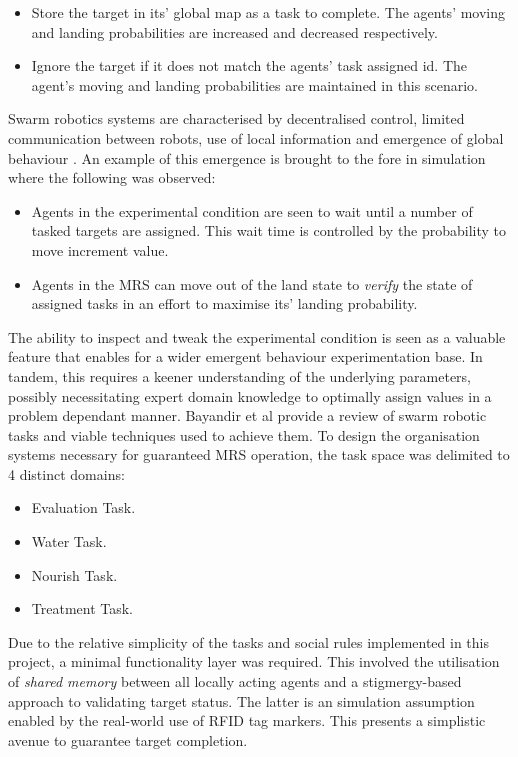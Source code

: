 \documentclass{report}
\begin{document}
\begin{itemize}
	\item Store the target in its' global map as a task to complete. The agents' moving and landing probabilities are increased and decreased respectively.
	\item Ignore the target if it does not match the agents' task assigned id. The agent's moving and landing probabilities are maintained in this scenario.
\end{itemize}

Swarm robotics systems are characterised by decentralised control, limited communication between robots, use of local information and emergence of global behaviour \cite{Dorigo2013}. An example of this emergence is brought to the fore in simulation where the following was observed:
\begin{itemize}
	\item Agents in the experimental condition are seen to wait until a number of tasked targets are assigned. This wait time is controlled by the probability to move increment value.
	\item Agents in the MRS can move out of the land state to \textit{verify} the state of assigned tasks in an effort to maximise its' landing probability.
\end{itemize}

The ability to inspect and tweak the experimental condition is seen as a valuable feature that enables for a wider emergent behaviour experimentation base. In tandem, this requires a keener understanding of the underlying parameters, possibly necessitating expert domain knowledge to optimally assign values in a problem dependant manner. Bayandir et al \cite{Bayindir2016} provide a review of swarm robotic tasks and viable techniques used to achieve them. To design the organisation systems necessary for guaranteed MRS operation, the task space was delimited to 4 distinct domains:
\begin{itemize}
	\item Evaluation Task.
	\item Water Task.
	\item Nourish Task.
	\item Treatment Task.
\end{itemize}

Due to the relative simplicity of the tasks and social rules implemented in this project, a minimal functionality layer was required. This involved the utilisation of \textit{shared memory} between all locally acting agents and a stigmergy-based approach to validating target status. The latter is an simulation assumption enabled by the real-world use of RFID tag markers. This presents a simplistic avenue to guarantee target completion.
\end{document}
